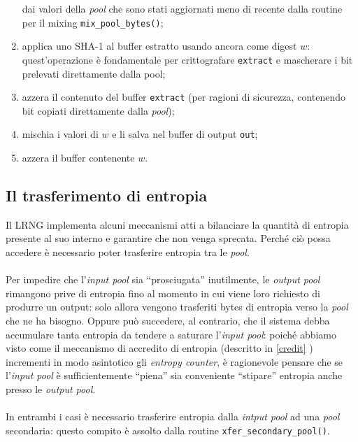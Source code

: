 \documentclass{article}
\begin{document}
\begin{enumerate}
   dai valori della \emph{pool} che sono stati aggiornati meno di recente dalla
   routine per il mixing \verb+mix_pool_bytes()+;
   \item applica uno SHA-1 al buffer estratto usando ancora come digest $w$:
   quest'operazione è fondamentale per crittografare \verb+extract+ e mascherare i
   bit prelevati direttamente dalla pool;
   \item azzera il contenuto del buffer \verb+extract+ (per ragioni di sicurezza,
   contenendo bit copiati direttamente dalla \emph{pool});
   \item mischia i valori di $w$ e li salva nel buffer di output \verb+out+;
   \item azzera il buffer contenente $w$.
 \end{enumerate}
 
 \subsection{Il trasferimento di entropia}\label{trasferimentoentropia}
 Il LRNG implementa alcuni meccanismi atti a bilanciare la quantità di
 entropia presente al suo interno e garantire che non venga
 sprecata. Perché ciò possa accedere è necessario poter trasferire entropia tra
 le \emph{pool}.
  
 \paragraph{}Per impedire che l'\emph{input pool} sia
 ``prosciugata'' inutilmente, le \emph{output pool} rimangono prive di entropia
 fino al momento in cui viene loro richiesto di produrre un output: solo allora
 vengono trasferiti bytes di entropia verso la
 \emph{pool} che ne ha bisogno.
 Oppure può succedere, al contrario, che il sistema debba accumulare tanta
 entropia da tendere a saturare l'\emph{input pool}: poiché abbiamo visto come
 il meccanismo di accredito di entropia (descritto in \ref{credit} ) incrementi
 in modo asintotico gli \emph{entropy counter}, è ragionevole pensare che se
 l'\emph{input pool} è sufficientemente ``piena'' sia conveniente ``stipare''
 entropia anche presso le \emph{output pool}.
 
 \paragraph{}In entrambi i casi è necessario trasferire entropia dalla
 \emph{intput pool} ad una \emph{pool} secondaria: questo compito è assolto
 dalla routine \verb+xfer_secondary_pool()+.
 
\end{document}
